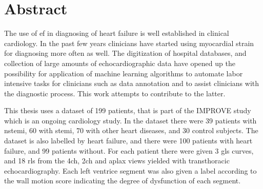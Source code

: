 \chapter*{Abstract}
%

The use of \acrlong{ef} in diagnosing of heart failure is well established in clinical cardiology. In the past few years clinicians have started using myocardial strain for diagnosing more often as well. The digitization of hospital databases, and collection of large amounts of echocardiographic data have opened up the possibility for application of machine learning algorithms to automate labor intensive tasks for clinicians such as data annotation and to assist clinicians with the diagnostic process. This work attempts to contribute to the latter. \bigskip

This thesis uses a dataset of 199 patients, that is part of the IMPROVE study which is an ongoing cardiology study. In the dataset there were 39 patients with \acrlong{nstemi}, 60 with \acrlong{stemi}, 70 with other heart diseases, and 30 control subjects. The dataset is also labelled by heart failure, and there were 100 patients with heart failure, and 99 patients without. For each patient there were given 3 \acrlong{gls} curves, and 18 \acrlong{rls} from the \acrlong{4ch}, \acrlong{2ch} and \acrlong{aplax} views yielded with transthoracic echocardiography. Each left ventrice segment was also given a label according to the wall motion score indicating the degree of dysfunction of each segment. \bigskip

